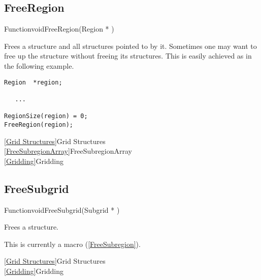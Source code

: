 
\newpage
\subsection{FreeRegion}
\label{FreeRegion}


\begin{deftypefn}{Function}{void}{FreeRegion}({Region *} )

\DESCRIPTION
Frees a  structure and all 
structures pointed to by it.
Sometimes one may want to free up the  structure
without freeing its  structures.
This is easily achieved as in the following example.

\EXAMPLE
\mbox{}
\begin{display}\begin{verbatim}
Region  *region;

   ...

RegionSize(region) = 0;
FreeRegion(region);
\end{verbatim}\end{display}

\SEEALSO
\vref{Grid Structures}{Grid Structures}\\
\vref{FreeSubregionArray}{FreeSubregionArray}\\
\vref{Gridding}{Gridding}

\end{deftypefn}


\newpage
\subsection{FreeSubgrid}
\label{FreeSubgrid}


\begin{deftypefn}{Function}{void}{FreeSubgrid}({Subgrid *} )

\DESCRIPTION
Frees a  structure.

\NOTES
This is currently a macro (\ref{FreeSubregion}).

\SEEALSO
\vref{Grid Structures}{Grid Structures}\\
\vref{Gridding}{Gridding}

\end{deftypefn}

